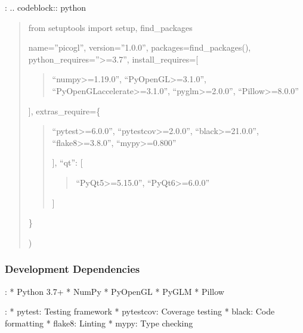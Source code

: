 \documentclass[a4paper,10pt,english,openany,oneside]{sphinxmanual}
\begin{document}
\sphinxAtStartPar
{}:
.. code\sphinxhyphen{}block:: python
\begin{quote}

\sphinxAtStartPar
from setuptools import setup, find\_packages
\begin{description}
\sphinxAtStartPar
name=”picogl”,
version=”1.0.0”,
packages=find\_packages(),
python\_requires=”\textgreater{}=3.7”,
install\_requires={[}
\begin{quote}

\sphinxAtStartPar
“numpy\textgreater{}=1.19.0”,
“PyOpenGL\textgreater{}=3.1.0”,
“PyOpenGL\sphinxhyphen{}accelerate\textgreater{}=3.1.0”,
“pyglm\textgreater{}=2.0.0”,
“Pillow\textgreater{}=8.0.0”
\end{quote}

\sphinxAtStartPar
{]},
extras\_require=\{
\begin{quote}
\begin{description}
\sphinxlineitem{“dev”: {[}}
\sphinxAtStartPar
“pytest\textgreater{}=6.0.0”,
“pytest\sphinxhyphen{}cov\textgreater{}=2.0.0”,
“black\textgreater{}=21.0.0”,
“flake8\textgreater{}=3.8.0”,
“mypy\textgreater{}=0.800”

\end{description}

\sphinxAtStartPar
{]},
“qt”: {[}
\begin{quote}

\sphinxAtStartPar
“PyQt5\textgreater{}=5.15.0”,
“PyQt6\textgreater{}=6.0.0”
\end{quote}

\sphinxAtStartPar
{]}
\end{quote}

\sphinxAtStartPar
\}

\end{description}

\sphinxAtStartPar
)
\end{quote}


\subsubsection{Development Dependencies}
\label{\detokenize{development:development-dependencies}}
\sphinxAtStartPar
{}:
* Python 3.7+
* NumPy
* PyOpenGL
* PyGLM
* Pillow

\sphinxAtStartPar
{}:
* pytest: Testing framework
* pytest\sphinxhyphen{}cov: Coverage testing
* black: Code formatting
* flake8: Linting
* mypy: Type checking
\end{document}
